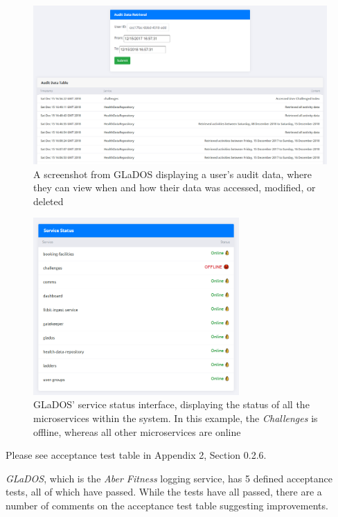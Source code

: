 \begin{figure}[H]
    \centering
    \includegraphics[width=\textwidth]{Images/service_glados.png}
    \caption{A screenshot from GLaDOS displaying a user's audit data, where they can view when and how their data was accessed, modified, or deleted}
\end{figure}

\begin{figure}[H]
    \centering
    \includegraphics[width=0.7\textwidth]{Images/service_status.png}
    \caption{GLaDOS' service status interface, displaying the status of all the microservices within the system. In this example, the \textit{Challenges} is offline, whereas all other microservices are online}
\end{figure}

Please see acceptance test table in Appendix 2, Section 0.2.6.

\textit{GLaDOS}, which is the \textit{Aber Fitness} logging service, has 5 defined acceptance tests, all of which have passed. While the tests have all passed, there are a number of comments on the acceptance test table suggesting improvements.